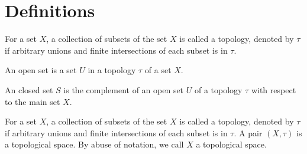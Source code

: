 \section{Definitions}

\begin{definition}[Topology]
	\label{definition-topology}
	For a set $X$, a collection of subsets 
	of the set $X$ is called a topology, denoted by $\tau$ 
	if arbitrary unions and finite intersections of each subset
	is in $\tau$.
\end{definition}

\begin{definition}
	\label{definition-open-set}
	An open set is a set $U$ in a topology $\tau$ of a set $X$.
\end{definition}

\begin{definition}
	\label{definition-closed-set}
	An closed set $S$ is the complement of an open set $U$ 
	of a topology $\tau$ with respect to the main set $X$.
\end{definition}

\begin{definition}
	\label{definition-topological space}
	For a set $X$, a collection of subsets 
	of the set $X$ is called a topology, denoted by $\tau$ 
	if arbitrary unions and finite intersections of each subset
	is in $\tau$. A pair $(X, \tau)$ is a topological space.
	By abuse of notation, we call $X$ a topological space.
\end{definition}
